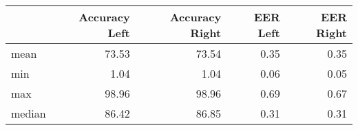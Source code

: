 \begin{tabular}{lrrrr}
\toprule
{} &  Accuracy Left &  Accuracy Right &  EER Left &  EER Right \\
\midrule
mean   &          73.53 &           73.54 &      0.35 &       0.35 \\
min    &           1.04 &            1.04 &      0.06 &       0.05 \\
max    &          98.96 &           98.96 &      0.69 &       0.67 \\
median &          86.42 &           86.85 &      0.31 &       0.31 \\
\bottomrule
\end{tabular}
